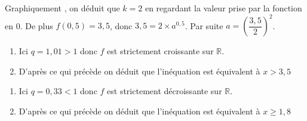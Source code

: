 \documentclass[french]{book}
\begin{document}
\begin{corrige}
Graphiquement , on déduit que $k=2$ en regardant la valeur prise par la fonction en 0.  De plus $f(0,5)=3,5$, donc $3,5=2 \times a^{0,5}$. Par suite $a=(\dfrac{3,5}{2})^2$.
\end{corrige}

\begin{corrige}
\begin{enumerate}
\item Ici $q=1,01>1$ donc $f$ est strictement croissante sur $\mathbb{R}$. 
\item D'après ce qui précède on déduit que l'inéquation est équivalent à $x>3,5$
\end{enumerate}
\end{corrige}

\begin{corrige}
\begin{enumerate}
\item Ici $q=0,33<1$ donc $f$ est strictement décroissante sur $\mathbb{R}$. 
\item D'après ce qui précède on déduit que l'inéquation est équivalent à $x\geq 1,8$
\end{enumerate}
\end{corrige}
\end{document}
